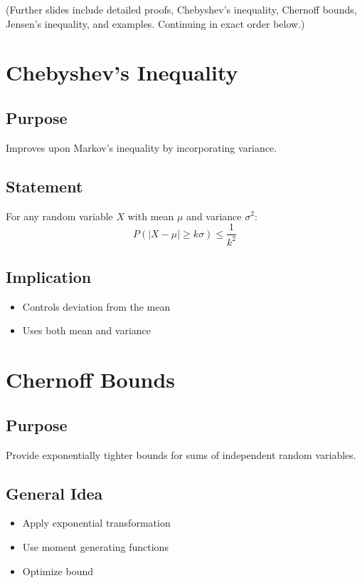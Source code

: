 \documentclass{article}
\begin{document}
(Further slides include detailed proofs, Chebyshev’s inequality, Chernoff bounds, Jensen’s inequality, and examples. Continuing in exact order below.)

\section{Chebyshev’s Inequality}

\subsection{Purpose}

Improves upon Markov’s inequality by incorporating variance.

\subsection{Statement}

For any random variable $X$ with mean $\mu$ and variance $\sigma^2$:
\begin{equation}
P(|X - \mu| \geq k\sigma) \leq \frac{1}{k^2}
\end{equation}

\subsection{Implication}

\begin{itemize}
    \item Controls deviation from the mean
    \item Uses both mean and variance
\end{itemize}

\section{Chernoff Bounds}

\subsection{Purpose}

Provide exponentially tighter bounds for sums of independent random variables.

\subsection{General Idea}

\begin{itemize}
    \item Apply exponential transformation
    \item Use moment generating functions
    \item Optimize bound
\end{itemize}
\end{document}
